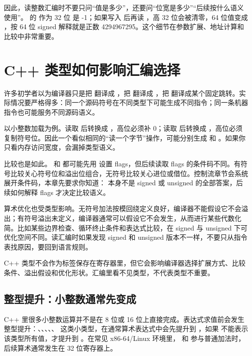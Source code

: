 因此，读整数汇编时不要只问“值是多少”，还要问“位宽是多少”“后续按什么语义使用”。 的  作为 32 位  是 -1；如果写入  后再读 ，高 32 位会被清零，64 位值变成 ，按 64 位 signed 解释就是正数 4294967295。这个细节在参数扩展、地址计算和比较中非常重要。

\section{C++ 类型如何影响汇编选择}

许多初学者以为编译器只是把 \code{+} 翻译成 ，把 \code{*} 翻译成 ，把 \code{<} 翻译成某个固定跳转。实际情况要严格得多：同一个源码符号在不同类型下可能生成不同指令；同一条机器指令也可能服务不同源码语义。

以小整数加载为例。读取  后转换成 ，高位必须补 0；读取  后转换成 ，高位必须复制符号位。因此一个看似相同的“读一个字节”操作，可能分别生成  和 。如果你只看内存访问宽度，会漏掉类型语义。

比较也是如此。 和  都可能先用  设置 flags，但后续读取 flags 的条件码不同。有符号比较关心符号位和溢出位组合，无符号比较关心进位或借位。控制流章节会系统展开条件码，本章先要求你知道： 本身不是 signed 或 unsigned 的全部答案，后续如何解释 flags 才决定比较语义。

算术优化也受类型影响。无符号加法按模回绕定义良好，编译器不能假设它不会溢出；有符号溢出未定义，编译器通常可以假设它不会发生，从而进行某些代数化简。比如某些边界检查、循环终止条件和表达式比较，在 signed 与 unsigned 下可优化空间不同。读汇编时如果发现 signed 和 unsigned 版本不一样，不要只从指令表找原因，要回到语言规则。

\begin{keyidea}
C++ 类型不会作为标签保存在寄存器里，但它会影响编译器选择扩展方式、比较条件、溢出假设和优化形状。汇编里看不见类型，不代表类型不重要。
\end{keyidea}

\subsection{整型提升：小整数通常先变成 }

C++ 里很多小整数运算并不是在 8 位或 16 位上直接完成。表达式求值前会发生整型提升：、、、、、 这类小类型，在通常算术表达式中会先提升到 ，如果  不能表示该类型所有值，才提升到 。在常见 x86-64/Linux 环境里， 和  参与普通加法时，后续算术通常发生在 32 位寄存器上。

